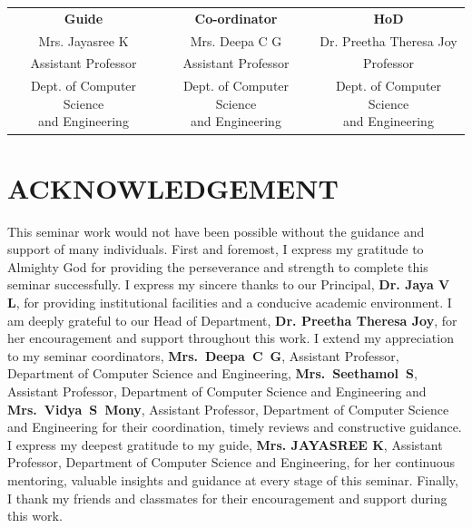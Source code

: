 \documentclass[12pt,a4paper]{report}
\newcommand{\guidename}{Mrs. JAYASREE K}
\newcommand{\coordinator}{Mrs. Deepa C G}
\newcommand{\hodname}{Dr. Preetha Theresa Joy}
\newcommand{\principalname}{Dr. Jaya V L}
\begin{document}
\vspace{1.5cm}
\begin{center}
\begin{tabular}{@{}c@{\hspace{0.45cm}}c@{\hspace{0.45cm}}c@{}}
\textbf{Guide} & \textbf{Co-ordinator} & \textbf{HoD}\\[2.0cm]

\parbox[c][0.55cm][c]{4.3cm}{\centering Mrs. Jayasree K} &
\parbox[c][0.55cm][c]{4.3cm}{\centering \coordinator} &
\parbox[c][0.55cm][c]{4.3cm}{\centering \hodname}\\[0.25cm]

\parbox[c][0.45cm][c]{4.3cm}{\centering Assistant Professor} &
\parbox[c][0.45cm][c]{4.3cm}{\centering Assistant Professor} &
\parbox[c][0.45cm][c]{4.3cm}{\centering Professor}\\[0.25cm]

\parbox[c][1.35cm][c]{4.3cm}{\centering \small Dept. of Computer Science\\ and Engineering} &
\parbox[c][1.35cm][c]{4.3cm}{\centering \small Dept. of Computer Science\\ and Engineering} &
\parbox[c][1.35cm][c]{4.3cm}{\centering \small Dept. of Computer Science\\ and Engineering}

\end{tabular}
\end{center}
\vspace*{0.5cm}

\newpage
{}


\chapter*{ACKNOWLEDGEMENT}
This seminar work would not have been possible without the guidance and support of many individuals. First and foremost, I express my gratitude to Almighty God for providing the perseverance and strength to complete this seminar successfully. I express my sincere thanks to our Principal, \textbf{\principalname}, for providing institutional facilities and a conducive academic environment. I am deeply grateful to our Head of Department, \textbf{\hodname}, for her encouragement and support throughout this work. I extend my appreciation to my seminar coordinators, \textbf{Mrs.~Deepa~C~G}, Assistant Professor, Department of Computer Science and Engineering, \textbf{Mrs.~Seethamol~S}, Assistant Professor, Department of Computer Science and Engineering and \textbf{Mrs.~Vidya~S~Mony}, Assistant Professor, Department of Computer Science and Engineering for their coordination, timely reviews and constructive guidance. I express my deepest gratitude to my guide, \textbf{\guidename}, Assistant Professor, Department of Computer Science and Engineering, for her continuous mentoring, valuable insights and guidance at every stage of this seminar. Finally, I thank my friends and classmates for their encouragement and support during this work.
\end{document}
